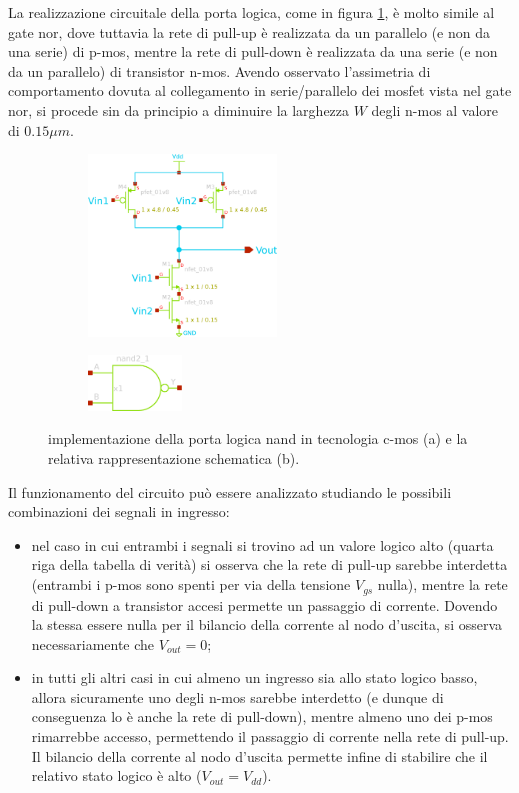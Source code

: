 	La realizzazione circuitale della porta logica, come in figura \ref{fig:nand:schematico}, è molto simile al gate nor, dove tuttavia la rete di pull-up è realizzata da un parallelo (e non da una serie) di p-mos, mentre la rete di pull-down è realizzata da una serie (e non da un parallelo) di transistor n-mos. Avendo osservato l'assimetria di comportamento dovuta al collegamento in serie/parallelo dei mosfet vista nel gate nor, si procede sin da principio a diminuire la larghezza $W$ degli n-mos al valore di $0.15 \mu m$.

	\begin{figure}[bht]
		\centering
		\begin{subfigure}{0.48\linewidth}
			\centering
			\includegraphics[width=5cm]{Immagini/nand-gate.eps} \caption{}			
		\end{subfigure}
		\begin{subfigure}{0.48\linewidth}
			\centering
			\includegraphics[width=2.5cm]{Immagini/nand-gate-simple.eps} \caption{}			
		\end{subfigure}
		\caption{implementazione della porta logica nand in tecnologia c-mos (a) e la relativa rappresentazione schematica (b).}
		\label{fig:nand:schematico}
	\end{figure}

	Il funzionamento del circuito può essere analizzato studiando le possibili combinazioni dei segnali in ingresso:
	\begin{itemize}
		\item nel caso in cui entrambi i segnali si trovino ad un valore logico alto (quarta riga della tabella di verità) si osserva che la rete di pull-up sarebbe interdetta (entrambi i p-mos sono spenti per via della tensione $V_{gs}$ nulla), mentre la rete di pull-down a transistor accesi permette un passaggio di corrente. Dovendo la stessa essere nulla per il bilancio della corrente al nodo d'uscita, si osserva necessariamente che $V_{out} = 0$;
		
		\item in tutti gli altri casi in cui almeno un ingresso sia allo stato logico basso, allora sicuramente uno degli n-mos sarebbe interdetto (e dunque di conseguenza lo è anche la rete di pull-down), mentre almeno uno dei p-mos rimarrebbe accesso, permettendo il passaggio di corrente nella rete di pull-up. Il bilancio della corrente al nodo d'uscita permette infine di stabilire che il relativo stato logico è alto ($V_{out} = V_{dd}$). 
	\end{itemize}

